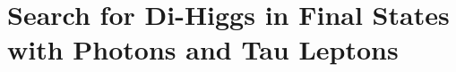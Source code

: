 \chapter{Search for Di-Higgs in Final States with Photons and Tau Leptons}\label{chap:dihiggs}











